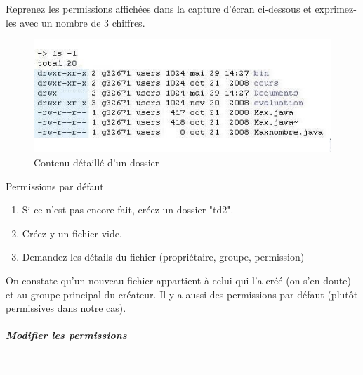 \documentclass[a4paper,11pt]{article}
\begin{document}
\begin{Exercice}{} 
	Reprenez les permissions affich\'ees dans la capture d'\'ecran ci-dessous 
et exprimez-les avec un nombre de 3 chiffres.  

\par
\begin{figure}[hbt]
	\begin{center}
		\includegraphics[width=0.8\linewidth,height=0.8\textheight,keepaspectratio=true]{image/ls-l-permissions.jpg}
		
	\end{center}
	
	\caption[Contenu d\'etaill\'e d'un dossier]{Contenu d\'etaill\'e d'un dossier}
\end{figure}
\end{Exercice}
		
		
\begin{Tutoriel}{Permissions par d\'efaut} 	
		
		\begin{enumerate}
			
			\item Si ce n'est pas encore fait, cr\'eez un dossier "td2".
			\item Cr\'eez-y un fichier vide.
			\item Demandez les d\'etails du fichier (propri\'etaire, groupe, permission)
		\end{enumerate}
		
		On constate qu'un nouveau fichier appartient \`a celui qui l'a cr\'e\'e 
		(on s'en doute) et au groupe principal du cr\'eateur. 
		Il y a aussi des permissions par d\'efaut (plut\^ot permissives dans notre cas).  
		
		\par
\end{Tutoriel}		
		
		\subparagraph{Modifier les permissions} 

\textcolor{white}{.} \par
\end{document}
